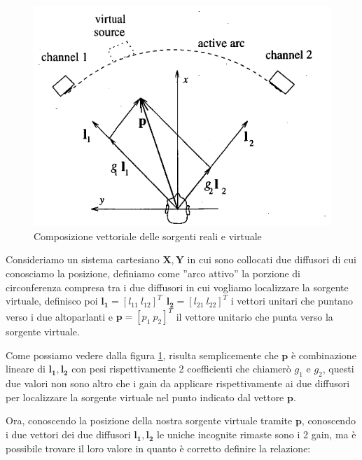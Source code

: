 \documentclass[12pt,a4paper]{report}
\begin{document}
\begin{figure}[htbp]
	\centering
	\includegraphics[scale=0.48]{figures/matrix2d.png}
	\caption {Composizione vettoriale delle sorgenti reali e virtuale}
	\label{fig:vettori2d}
	\end{figure}

Consideriamo un sistema cartesiano $ \boldsymbol{X},\boldsymbol{Y}$ in cui sono collocati due diffusori di cui conosciamo la posizione, definiamo come ''arco attivo'' la porzione di circonferenza compresa tra i due diffusori in cui vogliamo localizzare la sorgente virtuale, definisco poi $\boldsymbol{l_{1}}= {\left[ l_{11} \ l_{12} \right]}^T \ \  \boldsymbol{l_{2}}= {\left[ l_{21} \ l_{22} \right]}^T$ i vettori unitari che puntano verso i due altoparlanti e $\boldsymbol{p}= {\left[ p_1 \ p_2 \right]}^T$ il vettore unitario che punta verso la sorgente virtuale.

Come possiamo vedere dalla figura \ref{fig:vettori2d}, risulta semplicemente che $\boldsymbol{p}$ è combinazione lineare di $\boldsymbol{l_{1}}, \boldsymbol{l_{2}}$ con pesi rispettivamente 2 coefficienti che chiamerò $g_1$ e $g_2$, questi due valori non sono altro che i gain da applicare rispettivamente ai due diffusori per localizzare la sorgente virtuale nel punto indicato dal vettore $\boldsymbol{p}$.

Ora, conoscendo la posizione della nostra sorgente virtuale tramite $\boldsymbol{p}$, conoscendo i due vettori dei due diffusori $\boldsymbol{l_{1}}, \boldsymbol{l_{2}}$ le uniche incognite rimaste sono i 2 gain, ma è possibile trovare il loro valore in quanto è corretto definire la relazione: %
\end{document}
